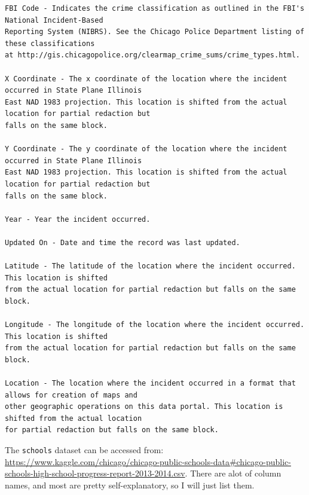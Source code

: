 \documentclass[11pt]{article}
\newcommand{\1}{\mathds{1}}
\def\code#1{\texttt{#1}}
\begin{document}
\begin{Verbatim}[fontsize=\small]
FBI Code - Indicates the crime classification as outlined in the FBI's National Incident-Based 
Reporting System (NIBRS). See the Chicago Police Department listing of these classifications 
at http://gis.chicagopolice.org/clearmap_crime_sums/crime_types.html.

X Coordinate - The x coordinate of the location where the incident occurred in State Plane Illinois 
East NAD 1983 projection. This location is shifted from the actual location for partial redaction but 
falls on the same block.

Y Coordinate - The y coordinate of the location where the incident occurred in State Plane Illinois 
East NAD 1983 projection. This location is shifted from the actual location for partial redaction but 
falls on the same block.

Year - Year the incident occurred.

Updated On - Date and time the record was last updated.

Latitude - The latitude of the location where the incident occurred. This location is shifted 
from the actual location for partial redaction but falls on the same block.

Longitude - The longitude of the location where the incident occurred. This location is shifted 
from the actual location for partial redaction but falls on the same block.

Location - The location where the incident occurred in a format that allows for creation of maps and 
other geographic operations on this data portal. This location is shifted from the actual location 
for partial redaction but falls on the same block.
\end{Verbatim}

\noindent
The \code{schools} dataset can be accessed from: \\
\href{https://www.kaggle.com/chicago/chicago-public-schools-data#chicago-public-schools-high-school-progress-report-2013-2014.csv}{https://www.kaggle.com/chicago/chicago-public-schools-data\#chicago-public-schools-high-school-progress-report-2013-2014.csv}. There are alot of column names, and most are pretty self-explanatory, so I will just list them.
\end{document}
